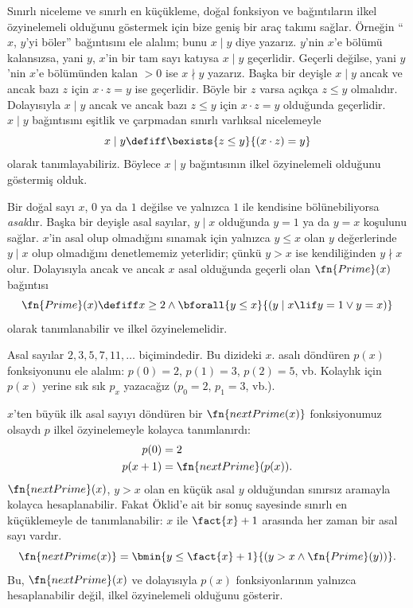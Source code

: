 


Sınırlı niceleme ve sınırlı en küçükleme, doğal fonksiyon ve bağıntıların
ilkel özyinelemeli olduğunu göstermek için bize geniş bir araç takımı sağlar.
Örneğin ``$x$, $y$'yi böler'' bağıntısını ele alalım; bunu $x\mid y$ diye
yazarız. $y$'nin $x$'e bölümü kalansızsa, yani $y$, $x$'in bir tam sayı
katıysa $x\mid y$ geçerlidir. Geçerli değilse, yani $y$'nin $x$'e bölümünden
kalan $>0$ ise $x\nmid y$ yazarız. Başka bir deyişle $x\mid y$ ancak ve
ancak bazı $z$ için $x\cdot z=y$ ise geçerlidir. Böyle bir $z$ varsa açıkça
$z\leq y$ olmalıdır. Dolayısıyla $x\mid y$ ancak ve ancak bazı $z\leq y$
için $x\cdot z=y$ olduğunda geçerlidir. $x\mid y$ bağıntısını eşitlik ve
çarpmadan sınırlı varlıksal nicelemeyle
\[
  x\mid y\defiff\bexists{z\leq y}{(x\cdot z)=y}
\]
olarak tanımlayabiliriz. Böylece $x\mid y$ bağıntısının ilkel özyinelemeli
olduğunu göstermiş olduk.

Bir doğal sayı $x$, $0$ ya da $1$ değilse ve yalnızca $1$ ile kendisine
bölünebiliyorsa \emph{asal}dır. Başka bir deyişle asal sayılar, $y\mid x$
olduğunda $y=1$ ya da $y=x$ koşulunu sağlar. $x$'in asal olup olmadığını
sınamak için yalnızca $y\leq x$ olan $y$ değerlerinde $y\mid x$ olup
olmadığını denetlememiz yeterlidir; çünkü $y>x$ ise kendiliğinden
$y\nmid x$ olur. Dolayısıyla ancak ve ancak $x$ asal olduğunda geçerli olan
$\fn{Prime}(x)$ bağıntısı
\[
  \fn{Prime}(x)\defiff x\geq2\land
  \bforall{y\leq x}{(y\mid x\lif y=1\lor y=x)}
\]
olarak tanımlanabilir ve ilkel özyinelemelidir.

Asal sayılar $2,3,5,7,11,\dots$ biçimindedir. Bu dizideki $x$. asalı
döndüren $p(x)$ fonksiyonunu ele alalım: $p(0)=2$, $p(1)=3$,
$p(2)=5$, vb. Kolaylık için $p(x)$ yerine sık sık $p_x$ yazacağız
($p_0=2$, $p_1=3$, vb.).

$x$'ten büyük ilk asal sayıyı döndüren bir $\fn{nextPrime(x)}$ fonksiyonumuz
olsaydı $p$ ilkel özyinelemeyle kolayca tanımlanırdı:
\begin{align*}
  p(0) & = 2\\
  p(x+1) & = \fn{nextPrime}(p(x)).
\end{align*}
$\fn{nextPrime}(x)$, $y>x$ olan en küçük asal $y$ olduğundan sınırsız
aramayla kolayca hesaplanabilir. Fakat Öklid'e ait bir sonuç sayesinde
sınırlı en küçüklemeyle de tanımlanabilir: $x$ ile $\fact{x}+1$ arasında
her zaman bir asal sayı vardır.
\[
  \fn{nextPrime(x)}=
  \bmin{y\leq\fact{x}+1}{(y>x\land\fn{Prime}(y))}.
\]
Bu, $\fn{nextPrime}(x)$ ve dolayısıyla $p(x)$ fonksiyonlarının yalnızca
hesaplanabilir değil, ilkel özyinelemeli olduğunu gösterir.

